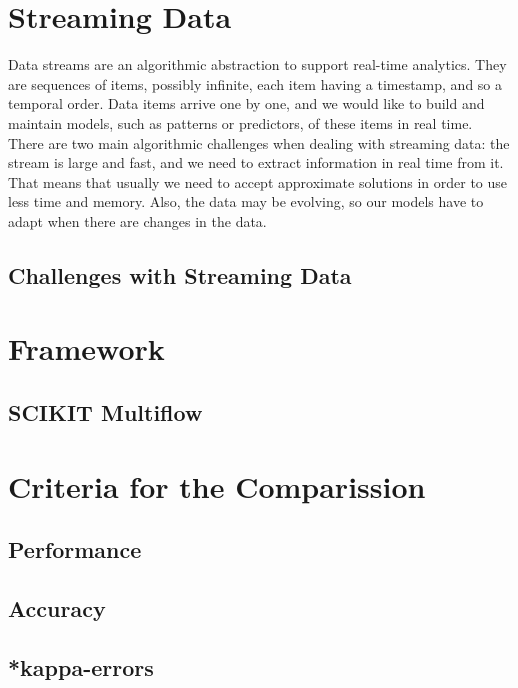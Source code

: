\documentclass[12pt,oneside,a4paper,parskip]{scrbook}
\begin{document}
\pagebreak

\section{Streaming Data}

Data streams are an algorithmic abstraction to support real-time analytics. They are sequences of items, 
possibly infinite, each item having a timestamp, and so a temporal order. Data items arrive one by one, 
and we would like to build and maintain models, such as patterns or predictors, of these items in real time. 
There are two main algorithmic challenges when dealing with streaming data: the stream is large and fast, 
and we need to extract information in real time from it. That means that usually we need to accept approximate 
solutions in order to use less time and memory.
Also, the data may be evolving, so our models have to adapt when there are changes in the data. \cite{MLonDataStreams}

\subsection{Challenges with Streaming Data}

\section{Framework}

\subsection{SCIKIT Multiflow}

\section{Criteria for the Comparission}

\subsection{Performance}

\subsection{Accuracy}

\subsection{*kappa-errors}
\end{document}
